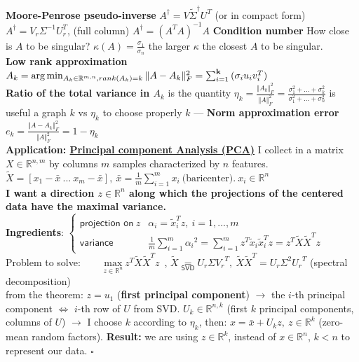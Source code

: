 \documentclass[a4paper]{article}
\begin{document}
\textbf{Moore-Penrose pseudo-inverse} $A^\dagger=V\tilde{\Sigma}^\dagger{U^T}$ (or in compact form) $A^{\dagger}=V_r\Sigma^{-1} U_r^T$, (full column) $A^{\dagger}=(A^T A)^{-1}A$
\textbf{Condition number} \textsf{How close is $A$ to be singular?} $\kappa(A)=\frac{\sigma_1}{\sigma_n}$ the larger $\kappa$ the closest $A$ to be singular.\\
\textbf{Low rank approximation} $A_k = \arg\min_{A_k\in\mathbb{R}^{m,n},\\  rank(A_k)=k}{\Vert A-A_k \Vert_F^2}=
\sum_{i=1}^\mathbf{k} {(\sigma_i u_i v_i^T)}$\\
\textbf{Ratio of the total variance in $A_k$} is the quantity $\eta_k  =  \frac{\Vert A_k \Vert_F^2}{\Vert A \Vert_F^2}= \frac{\sigma_1^2+...+\sigma_k^2}{\sigma_1^2+...+\sigma_n^2}$ is useful a graph $k$ vs $\eta_k$ to choose properly $k$ --- \textbf{Norm approximation error} $e_k=\frac{\Vert A-A_k \Vert_F^2}{\Vert A \Vert_F^2}=1-\eta_k$ \\
\textbf{Application: \underline{Principal component Analysis (PCA)}} I collect in a matrix $X\in\mathbb{R}^{n,m}$ by columns $m$ samples characterized by $n$ features. $\tilde{X}=[x_1-\bar{x}\ ...\ x_m-\bar{x}], \ \bar{x}=\frac{1}{m}\sum_{i=1}^m {x_i} \ \text{(baricenter)}.  \ x_i \in \mathbb{R}^n$\\
\textbf{I want a direction $z\in\mathbb{R}^n$ along which the projections of the centered data have the maximal variance.}\\
\textbf{Ingredients}: $\begin{cases}
    \textsf{projection on} \ z & \alpha_i=\tilde{x}_i^T{z}, \ i=1,...,m\\
    \textsf{variance}& \frac{1}{m} \sum_{i=1}^{m}{\alpha_i}^2=\sum_{i=1}^{m}{z^T \tilde{x}_i \tilde{x}_i^T{z}}=z^T\tilde{X}\tilde{X}^T{z} 
\end{cases}$\\
Problem to solve: $\qquad\underset{z\in\mathbb{R}^n}{\text{max}}\ {z^T \tilde{X}\tilde{X}^T z}$\ , 
$\tilde{X} \underset{\textsf{SVD}}{=}U_r\Sigma{V_r}^T, \ \tilde{X}\tilde{X}^T=U_r\Sigma^2{U_r}^T$ (spectral decomposition)\\
from the theorem: $z=u_1$ (\textbf{first principal component}) $\to$ the $i$-th principal component $\iff$ $i$-th row of $U$ from SVD. $U_k \in \mathbb{R}^{n,k}$ (first $k$ principal components, columns of $U$) $\longrightarrow$ I choose $k$ according to $\eta_k$, then: $x=\bar{x}+U_k{z},
\ z\in\mathbb{R}^k$ (zero-mean random factors). \textbf{Result:} we are using $z\in\mathbb{R}^k$, instead of $x\in\mathbb{R}^n$, $k<n$ to represent our data. $\square$\\
\end{document}
